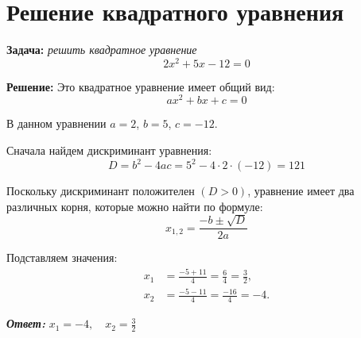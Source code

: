 \documentclass{article}
\begin{document}
\section{Решение квадратного уравнения}

\textbf{\large Задача:} \textit{решить квадратное уравнение} 
\begin{equation}
    2x^{2}+5x-12=0
\end{equation}

\vspace{0.5cm}

\textbf{\large Решение:} Это квадратное уравнение имеет общий вид:
\begin{equation}
    ax^{2}+bx+c=0
\end{equation}

\noindent В данном уравнении \( a = 2 \), \( b = 5 \), \( c = -12 \).

\vspace{0.5cm}

Сначала найдем дискриминант уравнения:
\begin{equation}
    D = b^{2}-4ac = 5^{2} - 4 \cdot 2 \cdot (-12) = 121
\end{equation}

Поскольку дискриминант положителен \( (D > 0) \), уравнение имеет два различных корня, которые можно найти по формуле:
\begin{equation}
    x_{1,2} = \frac{-b \pm \sqrt{D}}{2a}
\end{equation}

Подставляем значения:
\begin{align*}
    x_1 &= \frac{-5 + 11}{4} = \frac{6}{4} = \frac{3}{2}, \\
    x_2 &= \frac{-5 - 11}{4} = \frac{-16}{4} = -4.
\end{align*}

\vspace{0.5cm}

\begin{flushright}
    \textbf{\textit{Ответ:}} \( x_1 = -4, \quad x_2 = \frac{3}{2} \)
\end{flushright}
\end{document}
